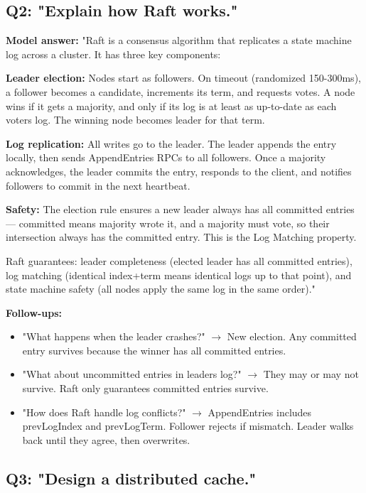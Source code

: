 \documentclass[11pt]{article}
\providecommand{\tightlist}{\setlength{\itemsep}{1pt}\setlength{\parskip}{0pt}}
\begin{document}
\subsection{Q2: "Explain how Raft works."}\label{q2-explain-how-raft-works}

\textbf{Model answer:}
"Raft is a consensus algorithm that replicates a state machine log across a cluster. It has three key components:

\textbf{Leader election:} Nodes start as followers. On timeout (randomized 150-300ms), a follower becomes a candidate, increments its term, and requests votes. A node wins if it gets a majority, and only if its log is at least as up-to-date as each voter\textquotesingle s log. The winning node becomes leader for that term.

\textbf{Log replication:} All writes go to the leader. The leader appends the entry locally, then sends AppendEntries RPCs to all followers. Once a majority acknowledges, the leader commits the entry, responds to the client, and notifies followers to commit in the next heartbeat.

\textbf{Safety:} The election rule ensures a new leader always has all committed entries --- committed means majority wrote it, and a majority must vote, so their intersection always has the committed entry. This is the Log Matching property.

Raft guarantees: leader completeness (elected leader has all committed entries), log matching (identical index+term means identical logs up to that point), and state machine safety (all nodes apply the same log in the same order)."

\textbf{Follow-ups:}

\begin{itemize}
\tightlist
\item
  "What happens when the leader crashes?" \(\rightarrow\) New election. Any committed entry survives because the winner has all committed entries.
\item
  "What about uncommitted entries in leader\textquotesingle s log?" \(\rightarrow\) They may or may not survive. Raft only guarantees committed entries survive.
\item
  "How does Raft handle log conflicts?" \(\rightarrow\) AppendEntries includes prevLogIndex and prevLogTerm. Follower rejects if mismatch. Leader walks back until they agree, then overwrites.
\end{itemize}

\subsection{Q3: "Design a distributed cache."}\label{q3-design-a-distributed-cache}
\end{document}
